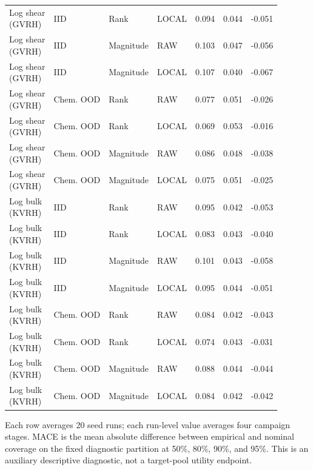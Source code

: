 \begin{longtable}{@{}llllrrr@{}}
\shortstack{Log shear\\(GVRH)} & IID & Rank & LOCAL & 0.094 & 0.044 & -0.051 \\
\shortstack{Log shear\\(GVRH)} & IID & Magnitude & RAW & 0.103 & 0.047 & -0.056 \\
\shortstack{Log shear\\(GVRH)} & IID & Magnitude & LOCAL & 0.107 & 0.040 & -0.067 \\
\shortstack{Log shear\\(GVRH)} & Chem. OOD & Rank & RAW & 0.077 & 0.051 & -0.026 \\
\shortstack{Log shear\\(GVRH)} & Chem. OOD & Rank & LOCAL & 0.069 & 0.053 & -0.016 \\
\shortstack{Log shear\\(GVRH)} & Chem. OOD & Magnitude & RAW & 0.086 & 0.048 & -0.038 \\
\shortstack{Log shear\\(GVRH)} & Chem. OOD & Magnitude & LOCAL & 0.075 & 0.051 & -0.025 \\
\shortstack{Log bulk\\(KVRH)} & IID & Rank & RAW & 0.095 & 0.042 & -0.053 \\
\shortstack{Log bulk\\(KVRH)} & IID & Rank & LOCAL & 0.083 & 0.043 & -0.040 \\
\shortstack{Log bulk\\(KVRH)} & IID & Magnitude & RAW & 0.101 & 0.043 & -0.058 \\
\shortstack{Log bulk\\(KVRH)} & IID & Magnitude & LOCAL & 0.095 & 0.044 & -0.051 \\
\shortstack{Log bulk\\(KVRH)} & Chem. OOD & Rank & RAW & 0.084 & 0.042 & -0.043 \\
\shortstack{Log bulk\\(KVRH)} & Chem. OOD & Rank & LOCAL & 0.074 & 0.043 & -0.031 \\
\shortstack{Log bulk\\(KVRH)} & Chem. OOD & Magnitude & RAW & 0.088 & 0.044 & -0.044 \\
\shortstack{Log bulk\\(KVRH)} & Chem. OOD & Magnitude & LOCAL & 0.084 & 0.042 & -0.042 \\
\end{longtable}
\noindent\footnotesize Each row averages 20 seed runs; each run-level value averages four campaign stages. MACE is the mean absolute difference between empirical and nominal coverage on the fixed diagnostic partition at 50\%, 80\%, 90\%, and 95\%. This is an auxiliary descriptive diagnostic, not a target-pool utility endpoint.
